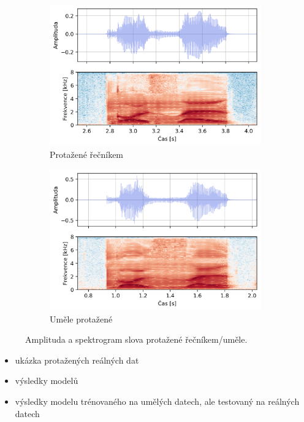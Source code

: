 \begin{figure}[htpb]
  \centering
  \begin{subfigure}[b]{0.42\textwidth}
    \includegraphics[width=\textwidth]{./ch6-realisation/img/energy_spec_word-kose_real.png}
    \caption{Protažené řečníkem}
    \label{fig:realisation:real:compare:real}
  \end{subfigure}
  \begin{subfigure}[b]{0.42\textwidth}
    \includegraphics[width=\textwidth]{./ch6-realisation/img/energy_spec_word-kose_augmented.png}
    \caption{Uměle protažené}
    \label{fig:realisation:real:compare:augmented}
  \end{subfigure}
  \caption{Amplituda a spektrogram slova  protažené řečníkem/uměle.}
  \label{fig:realisation:real:compare}
\end{figure}

\begin{itemize}
  \item ukázka protažených reálných dat
  \item výsledky modelů
  \item výsledky modelu trénovaného na umělých datech, ale testovaný na reálných datech
\end{itemize}

